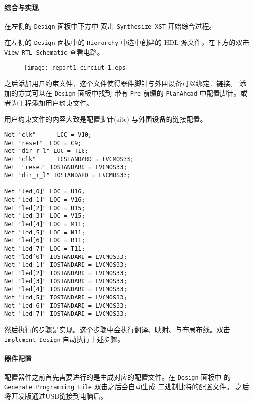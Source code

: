 \documentclass{ctexart}
\begin{document}
        \paragraph{综合与实现}

		在左侧的 \verb|Design| 面板中下方中 双击 \verb|Synthesize-XST| 开始综合过程。
		

        在左侧的 \verb|Design| 面板中的 \verb|Hierarchy| 中选中创建的 HDL 源文件，在下方的双击 \verb|View RTL Schematic| 查看电路。

        \begin{figure}
\centering
\texttt{[image: report1-circiut-1.eps]}
\caption[Circuit]{}
\label{fig:report1-circiut-1}
\end{figure}

		之后添加用户约束文件，这个文件使得器件脚针与外围设备可以绑定，链接。
		添加的方式可以在 \verb|Design| 面板中找到 带有 \verb|Pre| 前缀的 \verb|PlanAhead| 中配置脚针。或者为工程添加用户约束文件。
		
		用户约束文件的内容大致是配置脚针(site) 与外围设备的链接配置。
		\begin{lstlisting}
Net "clk"      LOC = V10;
Net "reset"  LOC = C9;
Net "dir_r_l" LOC = T10;
Net "clk"      IOSTANDARD = LVCMOS33;
Net  "reset" IOSTANDARD = LVCMOS33;
Net "dir_r_l" IOSTANDARD = LVCMOS33;

Net "led[0]" LOC = U16;
Net "led[1]" LOC = V16;
Net "led[2]" LOC = U15;
Net "led[3]" LOC = V15;
Net "led[4]" LOC = M11;
Net "led[5]" LOC = N11;
Net "led[6]" LOC = R11;
Net "led[7]" LOC = T11;
Net "led[0]" IOSTANDARD = LVCMOS33;
Net "led[1]" IOSTANDARD = LVCMOS33;
Net "led[2]" IOSTANDARD = LVCMOS33;
Net "led[3]" IOSTANDARD = LVCMOS33;
Net "led[4]" IOSTANDARD = LVCMOS33;
Net "led[5]" IOSTANDARD = LVCMOS33;
Net "led[6]" IOSTANDARD = LVCMOS33;
Net "led[7]" IOSTANDARD = LVCMOS33;
		\end{lstlisting}
		
		然后执行的步骤是实现。这个步骤中会执行翻译、映射、与布局布线。双击
		\verb|Implement Design| 自动执行上述步骤。
		
		\paragraph{器件配置}
		配置器件之前首先需要进行的是生成对应的配置文件。在 \verb|Design| 面板中
		的 \verb|Generate Programming File|  双击之后会自动生成 二进制比特的配置文件。
		之后将开发版通过USB链接到电脑后。
\end{document}
